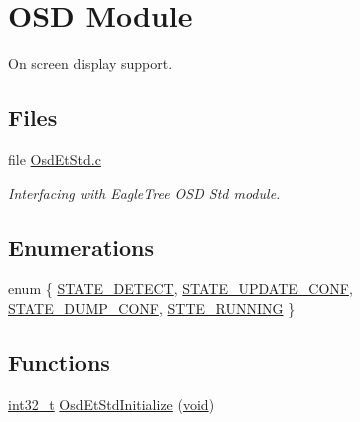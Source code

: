 \hypertarget{group___o_s_d_module}{\section{O\-S\-D Module}
\label{group___o_s_d_module}
}


On screen display support.  


\subsection*{Files}
\begin{DoxyCompactItemize}
\item 
file \hyperlink{_osd_et_std_8c}{Osd\-Et\-Std.\-c}
\begin{DoxyCompactList}\small\item\em Interfacing with Eagle\-Tree O\-S\-D Std module. \end{DoxyCompactList}\end{DoxyCompactItemize}
\subsection*{Enumerations}
\begin{DoxyCompactItemize}
\item 
enum \{ \hyperlink{group___o_s_d_module_ggadc29c2ff13d900c2f185ee95427fb06ca052abb1e652b9eed9a8c99f77bd38358}{S\-T\-A\-T\-E\-\_\-\-D\-E\-T\-E\-C\-T}, 
\hyperlink{group___o_s_d_module_ggadc29c2ff13d900c2f185ee95427fb06ca7c9ae8b56000c336a785ae45a9845b98}{S\-T\-A\-T\-E\-\_\-\-U\-P\-D\-A\-T\-E\-\_\-\-C\-O\-N\-F}, 
\hyperlink{group___o_s_d_module_ggadc29c2ff13d900c2f185ee95427fb06cab864d735aed90fa7b75c3648cd2dd375}{S\-T\-A\-T\-E\-\_\-\-D\-U\-M\-P\-\_\-\-C\-O\-N\-F}, 
\hyperlink{group___o_s_d_module_ggadc29c2ff13d900c2f185ee95427fb06cafbf60f6d0d0a911fd1849fbd70cf78b1}{S\-T\-T\-E\-\_\-\-R\-U\-N\-N\-I\-N\-G}
 \}
\end{DoxyCompactItemize}
\subsection*{Functions}
\begin{DoxyCompactItemize}
\item 
\hyperlink{group___n_a_m_e_gafd12020da5a235dfcf0c3c748fb5baed}{int32\-\_\-t} \hyperlink{group___o_s_d_module_gaef2fd8195e001c461c1c8f6b9de8807c}{Osd\-Et\-Std\-Initialize} (\hyperlink{group___n_a_m_e_ga18028b8badbf1ea7e704ccac3c488e82}{void})
\end{DoxyCompactItemize}
